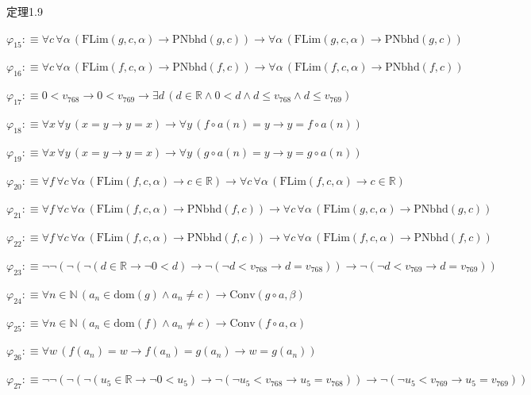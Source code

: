 \begin{fullproof}{定理1.9}
\begin{abbrevlist}
\item $\varphi_{15} :\equiv \forall c\,\forall \alpha\,(\mathrm{FLim}(g,c,\alpha) \to \mathrm{PNbhd}(g,c)) \to \forall \alpha\,(\mathrm{FLim}(g,c,\alpha) \to \mathrm{PNbhd}(g,c))$
\item $\varphi_{16} :\equiv \forall c\,\forall \alpha\,(\mathrm{FLim}(f,c,\alpha) \to \mathrm{PNbhd}(f,c)) \to \forall \alpha\,(\mathrm{FLim}(f,c,\alpha) \to \mathrm{PNbhd}(f,c))$
\item $\varphi_{17} :\equiv 0 < v_{768} \to 0 < v_{769} \to \exists d\,(d \in \mathbb{R} \land 0 < d \land d \leq v_{768} \land d \leq v_{769})$
\item $\varphi_{18} :\equiv \forall x\,\forall y\,(x = y \to y = x) \to \forall y\,(f \circ a(n) = y \to y = f \circ a(n))$
\item $\varphi_{19} :\equiv \forall x\,\forall y\,(x = y \to y = x) \to \forall y\,(g \circ a(n) = y \to y = g \circ a(n))$
\item $\varphi_{20} :\equiv \forall f\,\forall c\,\forall \alpha\,(\mathrm{FLim}(f,c,\alpha) \to c \in \mathbb{R}) \to \forall c\,\forall \alpha\,(\mathrm{FLim}(f,c,\alpha) \to c \in \mathbb{R})$
\item $\varphi_{21} :\equiv \forall f\,\forall c\,\forall \alpha\,(\mathrm{FLim}(f,c,\alpha) \to \mathrm{PNbhd}(f,c)) \to \forall c\,\forall \alpha\,(\mathrm{FLim}(g,c,\alpha) \to \mathrm{PNbhd}(g,c))$
\item $\varphi_{22} :\equiv \forall f\,\forall c\,\forall \alpha\,(\mathrm{FLim}(f,c,\alpha) \to \mathrm{PNbhd}(f,c)) \to \forall c\,\forall \alpha\,(\mathrm{FLim}(f,c,\alpha) \to \mathrm{PNbhd}(f,c))$
\item $\varphi_{23} :\equiv \neg \neg (\neg (\neg (d \in \mathbb{R} \to \neg 0 < d) \to \neg (\neg d < v_{768} \to d = v_{768})) \to \neg (\neg d < v_{769} \to d = v_{769}))$
\item $\varphi_{24} :\equiv \forall n \in \mathbb{N}\,(a_{n} \in \mathrm{dom}(g) \land a_{n} \neq c) \to \mathrm{Conv}(g \circ a,\beta)$
\item $\varphi_{25} :\equiv \forall n \in \mathbb{N}\,(a_{n} \in \mathrm{dom}(f) \land a_{n} \neq c) \to \mathrm{Conv}(f \circ a,\alpha)$
\item $\varphi_{26} :\equiv \forall w\,(f(a_{n}) = w \to f(a_{n}) = g(a_{n}) \to w = g(a_{n}))$
\item $\varphi_{27} :\equiv \neg \neg (\neg (\neg (u_{5} \in \mathbb{R} \to \neg 0 < u_{5}) \to \neg (\neg u_{5} < v_{768} \to u_{5} = v_{768})) \to \neg (\neg u_{5} < v_{769} \to u_{5} = v_{769}))$

\end{abbrevlist}
\end{fullproof}
